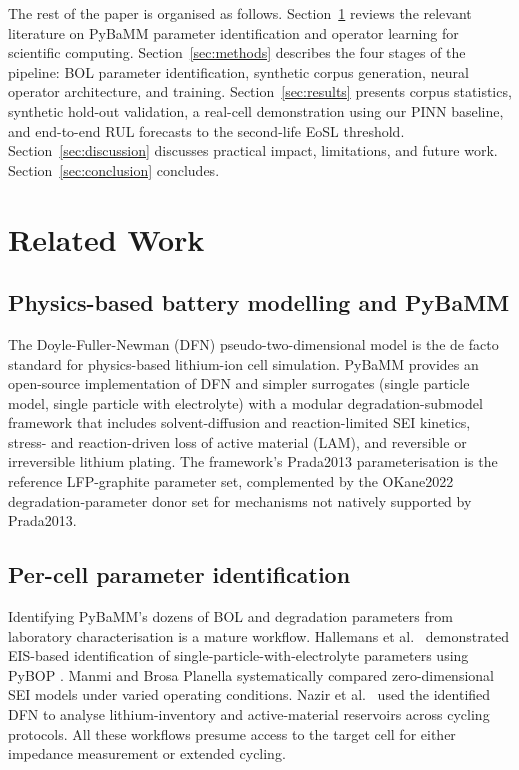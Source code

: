 \documentclass[preprint,12pt,3p,authoryear]{elsarticle}
\begin{document}
The rest of the paper is organised as follows. Section~\ref{sec:related}
reviews the relevant literature on PyBaMM parameter identification and
operator learning for scientific computing. Section~\ref{sec:methods}
describes the four stages of the pipeline: BOL parameter identification,
synthetic corpus generation, neural operator architecture, and training.
Section~\ref{sec:results} presents corpus statistics, synthetic hold-out
validation, a real-cell demonstration using our PINN baseline, and
end-to-end RUL forecasts to the second-life EoSL threshold.
Section~\ref{sec:discussion} discusses practical impact, limitations,
and future work. Section~\ref{sec:conclusion} concludes.

\section{Related Work}
\label{sec:related}

\subsection{Physics-based battery modelling and PyBaMM}
The Doyle-Fuller-Newman (DFN) pseudo-two-dimensional model
\citep{doyle1993modelling} is the de facto standard for
physics-based lithium-ion cell simulation. PyBaMM
\citep{sulzer2021pybamm} provides an open-source implementation of DFN
and simpler surrogates (single particle model, single particle with
electrolyte) with a modular degradation-submodel framework that includes
solvent-diffusion and reaction-limited SEI kinetics, stress- and
reaction-driven loss of active material (LAM), and reversible or
irreversible lithium plating. The framework's Prada2013
\citep{prada2013simplified} parameterisation is the reference
LFP-graphite parameter set, complemented by the OKane2022
\citep{okane2022lithium} degradation-parameter donor set for
mechanisms not natively supported by Prada2013.

\subsection{Per-cell parameter identification}
Identifying PyBaMM's dozens of BOL and degradation parameters from
laboratory characterisation is a mature workflow. Hallemans et al.\
\citep{hallemans2025impedance} demonstrated EIS-based identification of
single-particle-with-electrolyte parameters using PyBOP
\citep{planden2024pybop}. Manmi and Brosa Planella
\citep{manmi2025sei} systematically compared zero-dimensional SEI
models under varied operating conditions. Nazir et al.\
\citep{nazir2025reservoirs} used the identified DFN to analyse
lithium-inventory and active-material reservoirs across cycling
protocols. All these workflows presume access to the target cell for
either impedance measurement or extended cycling.
\end{document}
